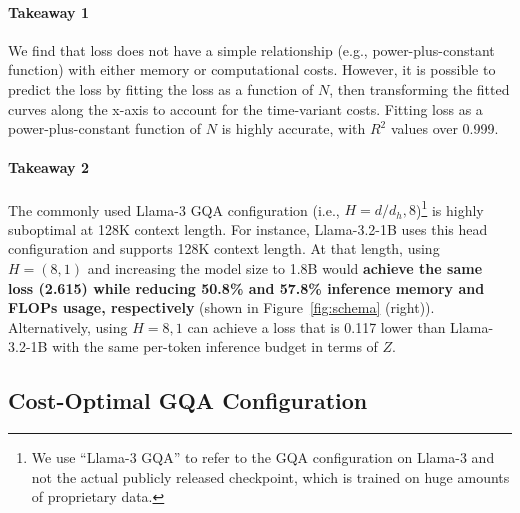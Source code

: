 \documentclass[11pt]{article}
\begin{document}
\paragraph{Takeaway 1}
We find that loss does not have a simple relationship (e.g., power-plus-constant function) with either memory or computational costs. However, it is possible to predict the loss by fitting the loss as a function of $N$, then transforming the fitted curves along the x-axis to account for the time-variant costs. Fitting loss as a power-plus-constant function of $N$ is highly accurate, with $R^2$ values over 0.999.

\paragraph{Takeaway 2}
The commonly used Llama-3 GQA configuration (i.e., $H=d/d_h, 8$)\footnote{We use ``Llama-3 GQA'' to refer to the GQA configuration on Llama-3 and not the actual publicly released checkpoint, which is trained on huge amounts of proprietary data.} is highly suboptimal at 128K context length. For instance, Llama-3.2-1B uses this head configuration and supports 128K context length. At that length, using $H=(8, 1)$ and increasing the model size to 1.8B would \textbf{achieve the same loss (2.615) while reducing 50.8\% and 57.8\% inference memory and FLOPs usage, respectively} (shown in Figure~\ref{fig:schema} (right)). Alternatively, using $H=8,1$ can achieve a loss that is 0.117 lower than Llama-3.2-1B with the same per-token inference budget in terms of $Z$.


\subsection{Cost-Optimal GQA Configuration}
\label{sec:cost-optimal-gqa-results}
\end{document}
